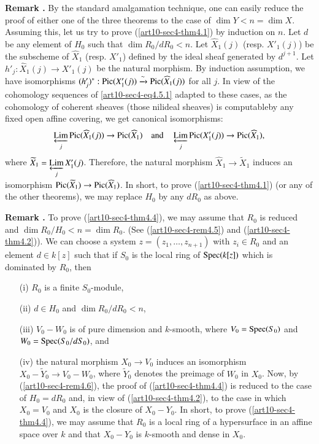\medskip
\noindent
{\bf Remark .\label{art10-sec4-rem4.6}}
By the standard amalgamation technique, one can easily reduce the proof of either one of the three theorems to the case of $\dim Y<n=\dim X$. Assuming this, let us try to prove (\ref{art10-sec4-thm4.1}) by induction on $n$. Let $d$ be any element of $H_{0}$ such that $\dim R_{0}/dR_{0}<n$. Let $\widehat{X}_{1}(j)$ (resp. $X'_{1}(j)$) be the subscheme of $\widehat{X}_{1}$ (resp. $X'_{1}$) defined by the ideal sheaf generated by $d^{j+1}$. Let $h'_{j}:\widehat{X}_{1}(j)\to X'_{1}(j)$ be the natural morphism. By induction assumption, we have isomorphisms $(h'_{j})^{*}:\operatorname{\mathrm{Pic}}(X'_{1}(j))\xrightarrow{\sim}\operatorname{\mathrm{Pic}}(\widehat{X}_{1}(j))$ for all $j$. In view of the cohomology sequences of \eqref{art10-sec4-eq4.5.1} adapted to these cases, as the cohomology of coherent sheaves (those nilideal sheaves) is computable\pageoriginale by any fixed open affine covering, we get canonical isomorphisms:
$$
\operatorname*{\underleftarrow{\mathrm{Lim}}}\limits_{j} \operatorname{\mathrm{Pic}}(\widehat{X}_{1}(j))\to \operatorname{\mathrm{Pic}} (\widehat{X}_{1})\quad\text{and}\quad \operatorname*{\underleftarrow{\mathrm{Lim}}}_{j}\operatorname{\mathrm{Pic}} (X'_{1}(j))\to \operatorname{\mathrm{Pic}}(\widehat{X}_{1}),
$$
where $\widetilde{X}_{1}=\operatorname*{\underleftarrow{\mathrm{Lim}}}\limits_{j}X'_{1}(j)$. Therefore, the natural morphism $\widehat{X}_{1}\to \widetilde{X}_{1}$ induces an isomorphism $\operatorname{\mathrm{Pic}} (\widetilde{X}_{1})\to \operatorname{\mathrm{Pic}}(\widehat{X}_{1})$. In short, to prove (\ref{art10-sec4-thm4.1}) (or any of the other theorems), we may replace $H_{0}$ by any $dR_{0}$ as above.

\medskip
\noindent
{\bf Remark .\label{art10-sec4-rem4.7}}
To prove (\ref{art10-sec4-thm4.4}), we may assume that $R_{0}$ is reduced and $\dim R_{0}/H_{0}<n=\dim R_{0}$. (See (\ref{art10-sec4-rem4.5}) and (\ref{art10-sec4-thm4.2})). We can choose a system $z=(z_{1},\ldots,z_{n+1})$ with $z_{i}\in R_{0}$ and an element $d\in k[z]$ such that if $S_{0}$ is the local ring of $\operatorname{Spec} (k[z])$ which is dominated by $R_{0}$, then
\begin{itemize}
\item[(i)] $R_{0}$ is a finite $S_{0}$-module,

\item[(ii)] $d\in H_{0}$ and $\dim R_{0}/dR_{0}<n$,

\item[(iii)] $V_{0}-W_{0}$ is of pure dimension and $k$-smooth, where $V_{0}=\operatorname{Spec} (S_{0})$ and $W_{0}=\operatorname{Spec} (S_{0}/dS_{0})$, and 

\item[(iv)] the natural morphism $X_{0}\to V_{0}$ induces an isomorphism $X_{0}-\widetilde{Y}_{0}\to V_{0}-W_{0}$, where $\widetilde{Y}_{0}$ denotes the preimage of $W_{0}$ in $X_{0}$. Now, by (\ref{art10-sec4-rem4.6}), the proof of (\ref{art10-sec4-thm4.4}) is reduced to the case of $H_{0}=dR_{0}$ and, in view of (\ref{art10-sec4-thm4.2}), to the case in which $X_{0}=V_{0}$ and $X_{0}$ is the closure of $X_{0}-Y_{0}$. In short, to prove (\ref{art10-sec4-thm4.4}), we may assume that $R_{0}$ is a local ring of a hypersurface in an affine space over $k$ and that $X_{0}-Y_{0}$ is $k$-smooth and dense in $X_{0}$.
\end{itemize}

